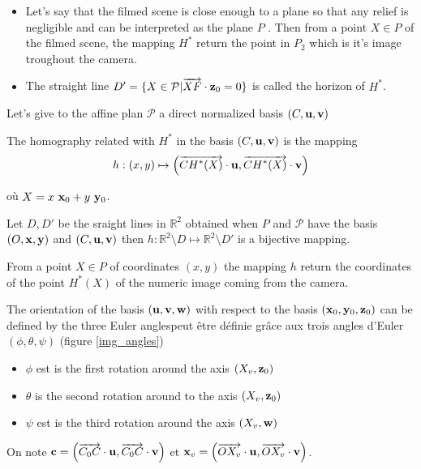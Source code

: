 \begin{remarques}
\begin{itemize}
\item Let's say that the filmed scene is close enough to a plane so that any relief is negligible and can be interpreted as the plane $P$ . Then from a point $X\in P$ of the filmed scene, the mapping $H^*$ return the point in $P_2$ which is it's image troughout the camera.
\item The straight line $D'=\{ X \in \mathcal{P} | \overrightarrow{XF} \cdot \mathbf{z}_0 =0 \}$ is called the horizon of $H^*$.
\end{itemize}

\end{remarques}
Let's give to the affine plan $\mathcal{P}$ a direct normalized basis $(C,\mathbf{u},\mathbf{v})$ 
\begin{Def}
 The homography related with $H^*$ in the basis $(C,\mathbf{u},\mathbf{v})$ is the mapping
\begin{equation}
h : (x,y)  \mapsto \left( \overrightarrow{CH^*(X)}\cdot \mathbf{u} , \overrightarrow{CH^*(X)}\cdot \mathbf{v} \right)
\label{formule_homographie_H}
\end{equation}


où $X=x~\mathbf{x}_0 + y~\mathbf{y}_0 $.
\label{def_homographie_H}
\end{Def}
Let $D,D'$ be the sraight lines in $\mathbb{R}^2$ obtained when $P$ and $\mathcal{P}$ have the basis $(O,\mathbf{x},\mathbf{y})$ and $(C,\mathbf{u},\mathbf{v})$ then $h:\mathbb{R}^2  \setminus D \mapsto \mathbb{R}^2  \setminus D'$ is a bijective mapping.
\begin{remarque}
From a point $X\in P$ of coordinates $(x,y)$  the mapping $h$ return the coordinates of the point $H^*(X)$ of the numeric image coming from the camera. 
\end{remarque}
The orientation of the basis $(\mathbf{u},\mathbf{v},\mathbf{w})$ with respect to the basis $(\mathbf{x}_0,\mathbf{y}_0,\mathbf{z}_0)$ can be defined by the three Euler anglespeut être définie grâce aux trois angles d'Euler $(\phi , \theta ,\psi )$ (figure \ref{img_angles})
\begin{itemize}
\item $\phi$ est is the first rotation around the axis $(X_v ,\mathbf{z}_0)$
\item $\theta$ is the second rotation around to the axis $(X_v , \mathbf{z}_0 )$
\item $\psi$ est is the third rotation around the axis $(X_v , \mathbf{w} )$
\end{itemize}
On note $\mathbf{c}= \left (\overrightarrow{C_0 C}\cdot \mathbf{u} , \overrightarrow{C_0 C}\cdot \mathbf{v} \right)$ et $\mathbf{x}_v=\left( \overrightarrow{O X_v}\cdot \mathbf{u} , \overrightarrow{O X_v}\cdot \mathbf{v} \right )$.\\
